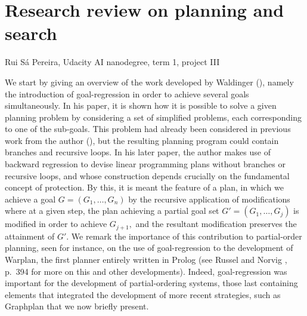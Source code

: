 \documentclass{report}
\begin{document}
\section*{Research review on planning and  search }
\begin{center}
Rui S\'a Pereira, Udacity AI nanodegree, term 1, project III
\end{center}
We start by giving an overview of the work developed by Waldinger (\cite{Waldinger}), namely the introduction of goal-regression  in order to achieve several goals simultaneously. In his paper, it is shown how it is possible to solve a given planning problem by considering a set of simplified problems, each corresponding to one of the sub-goals. This problem had already been considered in previous work from the author (\cite{Waldinger-previous}), but the resulting planning program could contain  branches and recursive loops. In his later  paper, the author makes use of backward regression to devise linear programming plans without branches or recursive loops, and whose construction depends crucially on the fundamental concept of protection. By this, it is meant the feature of a plan, in which we achieve a goal $G=(G_1, \ldots,G_n)$ by the recursive application of modifications where at a given step,  the plan achieving a partial goal set $G'=(G_1,\ldots,G_j)$ is modified in order to achieve $G_{j+1},$ and  the resultant modification  preserves the attainment of $G'.$  We remark the importance of this contribution to partial-order planning, seen for instance, on the use of goal-regression to the development of  Warplan,  the first planner entirely written in Prolog (see Russel and Norvig \cite{AI_book},  p.~394 for more on this and other developments). Indeed, goal-regression was important for the development of partial-ordering systems, those last containing elements that integrated the development of more recent strategies, such as Graphplan that we now briefly present.
\end{document}
